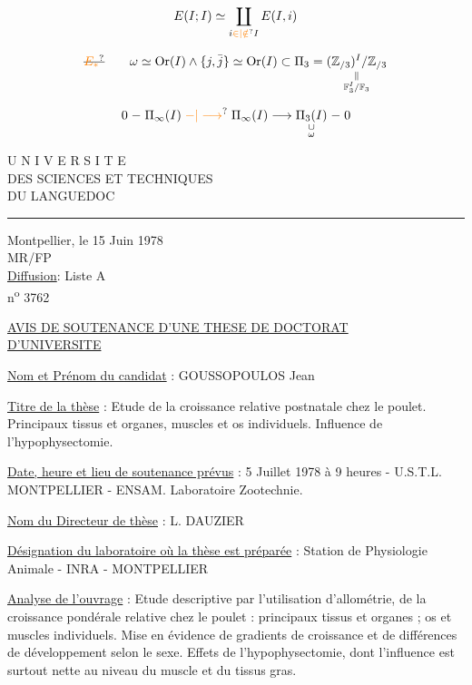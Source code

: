 \[
E(I;I)\simeq\coprod_{i\unsure{\in|\notin}I}E(I,i)
\]

\[
\deleted{\unsure{E_*}}\qquad\omega\simeq\operatorname{Or}(I)\wedge\{j,\bar j\}\simeq\operatorname{Or}(I)\subset\Pi_3=
\underset{\substack{\Vert\\\mathbb F_3^{I}/\mathbb F_3}}{(\mathbb Z_{/3})^{I}/\mathbb Z_{/3}}
\]


\[
0\mathrel{-}\Pi_\infty(I)\mathrel{\unsure{-|\longrightarrow}}\Pi_\infty(I)\longrightarrow\underset{\substack{\cup\\\omega}}{\Pi_3(I)}\mathrel{-}0
\]


U N I V E R S I T E\\
DES SCIENCES ET TECHNIQUES\\
DU LANGUEDOC\\
\rule{3em}{0.4pt}

Montpellier, le 15 Juin 1978\\

MR/FP\\
\uline{Diffusion}: Liste A\\
n\textsuperscript{o} 3762

\uline{AVIS DE SOUTENANCE D'UNE THESE DE DOCTORAT}\\
\uline{D'UNIVERSITE}

\uline{Nom et Prénom du candidat} : GOUSSOPOULOS Jean

\uline{Titre de la thèse} : Etude de la croissance relative postnatale chez le poulet. Principaux tissus et organes, muscles et os individuels. Influence de l'hypophysectomie.

\uline{Date, heure et lieu de soutenance prévus} : 5 Juillet 1978 à 9 heures - U.S.T.L. MONTPELLIER - ENSAM. Laboratoire Zootechnie.

\uline{Nom du Directeur de thèse} : L. DAUZIER

\uline{Désignation du laboratoire où la thèse est préparée} : Station de Physiologie Animale - INRA - MONTPELLIER

\uline{Analyse de l'ouvrage} : Etude descriptive par l'utilisation d'allométrie, de la croissance pondérale relative chez le poulet : principaux tissus et organes ; os et muscles individuels. Mise en évidence de gradients de croissance et de différences de développement selon le sexe. Effets de l'hypophysectomie, dont l'influence est surtout nette au niveau du muscle et du tissus gras.

